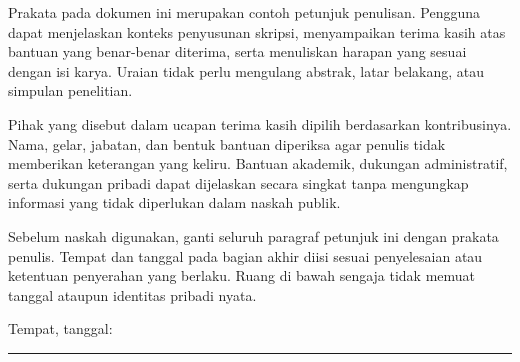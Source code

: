 
Prakata pada dokumen ini merupakan contoh petunjuk penulisan. Pengguna dapat menjelaskan konteks penyusunan skripsi, menyampaikan terima kasih atas bantuan yang benar-benar diterima, serta menuliskan harapan yang sesuai dengan isi karya. Uraian tidak perlu mengulang abstrak, latar belakang, atau simpulan penelitian.

Pihak yang disebut dalam ucapan terima kasih dipilih berdasarkan kontribusinya. Nama, gelar, jabatan, dan bentuk bantuan diperiksa agar penulis tidak memberikan keterangan yang keliru. Bantuan akademik, dukungan administratif, serta dukungan pribadi dapat dijelaskan secara singkat tanpa mengungkap informasi yang tidak diperlukan dalam naskah publik.

Sebelum naskah digunakan, ganti seluruh paragraf petunjuk ini dengan prakata penulis. Tempat dan tanggal pada bagian akhir diisi sesuai penyelesaian atau ketentuan penyerahan yang berlaku. Ruang di bawah sengaja tidak memuat tanggal ataupun identitas pribadi nyata.

\vspace{1.5cm}
\begin{flushright}
  Tempat, tanggal: \rule{4.0cm}{0.4pt}\par
  \vspace{1.6cm}
  \namamahasiswa
\end{flushright}
